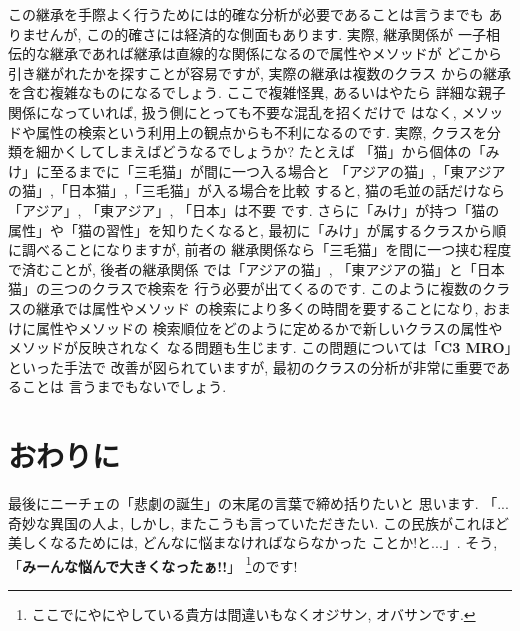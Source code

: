 \documentclass[b5j,8pt,twocolumn]{ltjsarticle}
\begin{document}
この継承を手際よく行うためには的確な分析が必要であることは言うまでも
ありませんが, この的確さには経済的な側面もあります. 実際, 継承関係が
一子相伝的な継承であれば継承は直線的な関係になるので属性やメソッドが
どこから引き継がれたかを探すことが容易ですが, 実際の継承は複数のクラス
からの継承を含む複雑なものになるでしょう. ここで複雑怪異, あるいはやたら
詳細な親子関係になっていれば, 扱う側にとっても不要な混乱を招くだけで
はなく, メソッドや属性の検索という利用上の観点からも不利になるのです.
 実際, クラスを分類を細かくしてしまえばどうなるでしょうか?  たとえば
「猫」から個体の「みけ」に至るまでに「三毛猫」が間に一つ入る場合と
「アジアの猫」,「東アジアの猫」,「日本猫」,「三毛猫」が入る場合を比較
すると, 猫の毛並の話だけなら「アジア」, 「東アジア」, 「日本」は不要
です. さらに「みけ」が持つ「猫の属性」や「猫の習性」を知りたくなると,
 最初に「みけ」が属するクラスから順に調べることになりますが, 前者の
継承関係なら「三毛猫」を間に一つ挟む程度で済むことが, 後者の継承関係
では「アジアの猫」, 「東アジアの猫」と「日本猫」の三つのクラスで検索を
行う必要が出てくるのです. このように複数のクラスの継承では属性やメソッド
の検索により多くの時間を要することになり, おまけに属性やメソッドの
検索順位をどのように定めるかで新しいクラスの属性やメソッドが反映されなく
なる問題も生じます. この問題については「\textbf{C3 MRO}」といった手法で
改善が図られていますが, 最初のクラスの分析が非常に重要であることは
言うまでもないでしょう.

\section{おわりに}

最後にニーチェの「悲劇の誕生」\cite{悲劇の誕生}の末尾の言葉で締め括りたいと
思います. 「...奇妙な異国の人よ, しかし, またこうも言っていただきたい.
 この民族がこれほど美しくなるためには, どんなに悩まなければならなかった
ことか!と...」. そう, 「\textbf{みーんな悩んで大きくなったぁ!!}」
\cite{野坂}\footnote{ここでにやにやしている貴方は間違いもなくオジサン,
 オバサンです.}のです!
\end{document}
